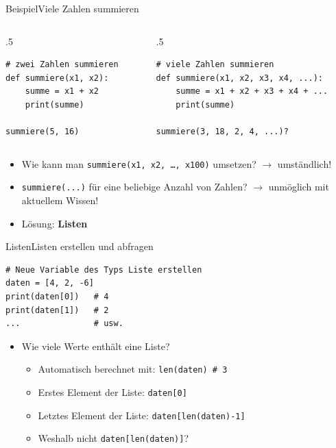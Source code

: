 \begin{frame}[fragile]{Beispiel}{Viele Zahlen summieren}
	\begin{columns}
		\begin{column}{.5\textwidth}
			\begin{lstlisting}[basicstyle=\ttfamily\scriptsize]
# zwei Zahlen summieren
def summiere(x1, x2):
	summe = x1 + x2
	print(summe)
	
summiere(5, 16)
\end{lstlisting}
		\end{column}

		\begin{column}{.5\textwidth}
			\begin{lstlisting}[basicstyle=\ttfamily\scriptsize]
# viele Zahlen summieren
def summiere(x1, x2, x3, x4, ...):
	summe = x1 + x2 + x3 + x4 + ...
	print(summe)
	
summiere(3, 18, 2, 4, ...)?
\end{lstlisting}
		\end{column}
	\end{columns}
	\begin{itemize}[<+->]
		\item Wie kann man \lstinline|summiere(x1, x2, …, x100)| umsetzen? $\rightarrow$ umständlich!
		\item \lstinline|summiere(...)| für eine beliebige Anzahl von Zahlen? $\rightarrow$ unmöglich mit aktuellem Wissen!
		\item Lösung: \textbf{Listen}
	\end{itemize}
\end{frame}




\begin{frame}[fragile]{Listen}{Listen erstellen und abfragen}
	\begin{lstlisting}
# Neue Variable des Typs Liste erstellen
daten = [4, 2, -6] 
print(daten[0])   # 4
print(daten[1])   # 2
...               # usw.
\end{lstlisting}

	\begin{itemize}[<+->]
		\item Wie viele Werte enthält eine Liste?
		      \begin{itemize}
			      \item Automatisch berechnet mit: \lstinline|len(daten) # 3|
			      \item Erstes Element der Liste: \lstinline|daten[0]|
			      \item Letztes Element der Liste: \lstinline|daten[len(daten)-1]|
			      \item Weshalb nicht \lstinline|daten[len(daten)]|?
		      \end{itemize}
	\end{itemize}
\end{frame}

